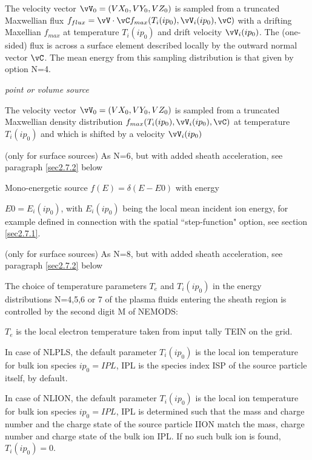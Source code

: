 \begin{list}{ }{}
\begin{list}{ }{}
The velocity vector $\vV_0 = (VX_0,VY_0,VZ_0)$ is sampled from a
truncated Maxwellian flux $f_{flux}= \vV \cdot \vC f_{max} (T_i(ip_0) ,\vV_i(ip_0) , \vC )$
with a drifting Maxellian $f_{max}$ at temperature
$ T_i(ip_0) $ and drift velocity $\vV_i(ip_0) $. The (one-sided) flux is
across a surface element described locally by the outward normal
vector $\vC $. The mean energy from this sampling distribution is
that given by option N=4.

\emph{point or volume source}

The velocity vector $\vV_0 = (VX_0,VY_0,VZ_0)$ is sampled from a
truncated Maxwellian density distribution $f_{max} (T_i(ip_0) ,\vV_i(ip_0) , \vC
)$ at temperature $ T_i(ip_0) $ and which is shifted by a velocity $\vV_i(ip_0) $

\item[{N = 7 }]
(only for surface sources)
As N=6, but with added sheath acceleration, see paragraph \ref{sec2.7.2} below

\item[{N = 8 }]
Mono-energetic source $f(E) = \delta (E-E0)$ with energy

$E0 = E_i(ip_0)$, with $E_i(ip_0)$ being the local mean incident ion energy, for example defined in connection with the spatial
``step-function" option, see section \ref{sec2.7.1}.
\item[{N = 9 }]
(only for surface sources)
As N=8, but with added sheath acceleration, see paragraph \ref{sec2.7.2} below
\end{list}
The choice of temperature parameters $T_e$ and $T_i(ip_0)$
in the energy distributions N=4,5,6 or 7
of the plasma fluids entering the sheath region
is controlled by the second digit M of NEMODS:
\begin{list}{ }{}
\item[{M =0 }]
$T_e$ is the local electron temperature taken from input tally TEIN
on the grid.

In case of NLPLS, the default parameter $T_i(ip_0)$ is the local ion
temperature for bulk ion species $ip_0=IPL$, IPL is the species index ISP of
the source particle itself, by default.

In case of NLION, the default parameter $T_i(ip_0)$ is the local ion
temperature for bulk ion species $ip_0=IPL$, IPL is determined such that
the mass and charge number and the charge state of the source
particle IION match the mass, charge number and charge state of the
bulk ion IPL. If no such bulk ion is found, $T_i(ip_0) = 0$.


\end{list}
\end{list}
